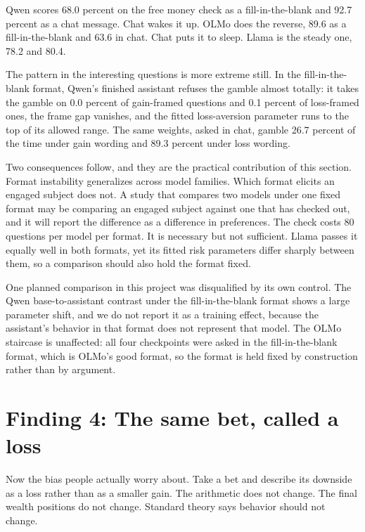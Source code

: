 \documentclass[11pt]{article}
\begin{document}
Qwen scores 68.0 percent on the free money check as a fill-in-the-blank and 92.7 percent as a
chat message. Chat wakes it up. OLMo does the reverse, 89.6 as a fill-in-the-blank and 63.6 in
chat. Chat puts it to sleep. Llama is the steady one, 78.2 and 80.4.

The pattern in the interesting questions is more extreme still. In the fill-in-the-blank format,
Qwen's finished assistant refuses the gamble almost totally: it takes the gamble on 0.0 percent
of gain-framed questions and 0.1 percent of loss-framed ones, the frame gap vanishes, and the
fitted loss-aversion parameter runs to the top of its allowed range. The same weights, asked in
chat, gamble 26.7 percent of the time under gain wording and 89.3 percent under loss wording.

Two consequences follow, and they are the practical contribution of this section. Format
instability generalizes across model families. Which format elicits an engaged subject does not.
A study that compares two models under one fixed format may be comparing an engaged subject
against one that has checked out, and it will report the difference as a difference in
preferences. The check costs 80 questions per model per format. It is necessary but not
sufficient. Llama passes it equally well in both formats, yet its fitted risk parameters differ
sharply between them, so a comparison should also hold the format fixed.

One planned comparison in this project was disqualified by its own control. The Qwen
base-to-assistant contrast under the fill-in-the-blank format shows a large parameter shift,
and we do not report it as a training effect, because the assistant's behavior in that format
does not represent that model. The OLMo staircase is unaffected: all four checkpoints were asked
in the fill-in-the-blank format, which is OLMo's good format, so the format is held fixed by
construction rather than by argument.

\section{Finding 4: The same bet, called a loss}

Now the bias people actually worry about. Take a bet and describe its downside as a loss rather
than as a smaller gain. The arithmetic does not change. The final wealth positions do not change.
Standard theory says behavior should not change.
\end{document}
